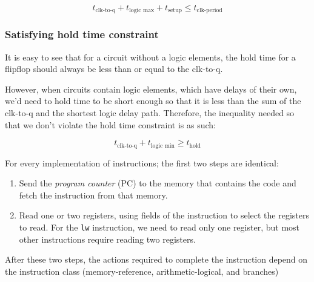 \documentclass[12pt]{article}
\begin{document}
$$t_{\text{clk-to-q}} + t_{\text{logic max}} + t_{\text{setup}} \le t_{\text{clk-period}}$$

\subsubsection*{Satisfying hold time constraint}
It is easy to see that for a circuit without a logic elements, the hold time for a flipflop should always be less than or equal to the clk-to-q.

However, when circuits contain logic elements, which have delays of their own, we'd need to hold time to be short enough so that it is less than the sum of the clk-to-q and the shortest logic delay path. Therefore, the inequality needed so that we don't violate the hold time constraint is as such:

$$
    t_{\text{clk-to-q}} + t_{\text{logic min}} \ge t_{\text{hold}}
$$




For every implementation of instructions; the first two steps are identical:
\begin{enumerate}
    \item Send the \emph{program counter} (PC) to the memory that contains the code and fetch the instruction from that memory.
    \item Read one or two registers, using fields of the instruction to select the registers to read. For the \lstinline{lw} instruction, we need to read only one register, but most other instructions require reading two registers.
\end{enumerate}

After these two steps, the actions required to complete the instruction depend on the instruction class (memory-reference, arithmetic-logical, and branches)

\begin{definition}

\end{definition}






\end{document}
